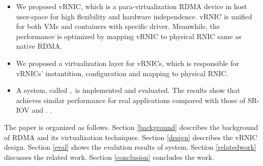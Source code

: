 \begin{itemize}
	\item We proposed vRNIC, which is a para-virtualization RDMA device in host user-space for high flexibility and hardware independence. vRNIC is unified for both VMs and containers with specific driver. Meanwhile, the performance is optimized by mapping vRNIC to physical RNIC same as native RDMA.
	
	\item We proposed a virtualization layer for vRNICs, which is responsible for vRNICs' instantition, configuration and mapping to physical RNIC. %
	
	\item A system, called \sys,~is implemented and evaluated. The results show that \sys achieves similar performance for real applications compared with those of SR-IOV and \native.  .
\end{itemize}
%
The paper is organized as follows. Section \ref{background} describes the background of RDMA and its virtualization techniques. Section \ref{design} describes the vRNIC design. %
Section \ref{eval} shows the evalution results of \sys system. Section \ref{relatedwork} discusses the related work. Section \ref{conclusion} concludes the work.